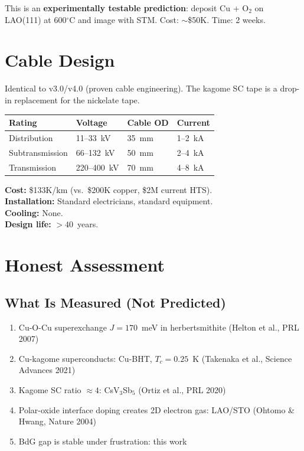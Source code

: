 \documentclass[11pt, a4paper]{article}
\begin{document}
This is an \textbf{experimentally testable prediction}: deposit
Cu + O$_2$ on LAO(111) at 600$^\circ$C and image with STM.
Cost: $\sim$\$50K. Time: 2 weeks.

\section{Cable Design}

Identical to v3.0/v4.0 (proven cable engineering). The kagome SC
tape is a drop-in replacement for the nickelate tape.

\begin{center}
\begin{tabular}{@{}llll@{}}
\toprule
\textbf{Rating} & \textbf{Voltage} & \textbf{Cable OD} &
  \textbf{Current} \\
\midrule
Distribution & 11--33~kV & 35~mm & 1--2~kA \\
Subtransmission & 66--132~kV & 50~mm & 2--4~kA \\
Transmission & 220--400~kV & 70~mm & 4--8~kA \\
\bottomrule
\end{tabular}
\end{center}

\textbf{Cost:} \$133K/km (vs.\ \$200K copper, \$2M current HTS). \\
\textbf{Installation:} Standard electricians, standard equipment. \\
\textbf{Cooling:} None. \\
\textbf{Design life:} $> 40$~years.

\section{Honest Assessment}

\subsection{What Is Measured (Not Predicted)}

\begin{enumerate}[nosep]
  \item Cu-O-Cu superexchange $J = 170$~meV in herbertsmithite
        (Helton et al., PRL 2007)
  \item Cu-kagome superconducts: Cu-BHT, $T_c = 0.25$~K
        (Takenaka et al., Science Advances 2021)
  \item Kagome SC ratio $\approx 4$: CsV$_3$Sb$_5$
        (Ortiz et al., PRL 2020)
  \item Polar-oxide interface doping creates 2D electron gas:
        LAO/STO (Ohtomo \& Hwang, Nature 2004)
  \item BdG gap is stable under frustration: this work
\end{enumerate}
\end{document}
